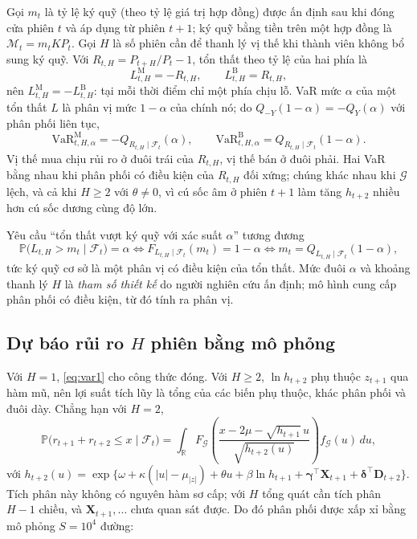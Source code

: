 \documentclass[12pt,a4paper]{article}
\theoremstyle{definition}
\theoremstyle{remark}
\newcommand{\Prob}{\mathbb{P}}
\newcommand{\VaR}{\mathrm{VaR}}
\newcommand{\Fcal}{\mathcal{F}}
\newcommand{\Gcal}{\mathcal{G}}
\newcommand{\bgamma}{\boldsymbol{\gamma}}
\newcommand{\bdelta}{\boldsymbol{\delta}}
\newcommand{\bX}{\mathbf{X}}
\newcommand{\bD}{\mathbf{D}}
\begin{document}
Gọi $m_t$ là tỷ lệ ký quỹ (theo tỷ lệ giá trị hợp đồng) được ấn định sau khi đóng cửa phiên $t$ và áp dụng từ phiên $t+1$; ký quỹ bằng tiền trên một hợp đồng là $\mathcal M_t=m_tKP_t$. Gọi $H$ là số phiên cần để thanh lý vị thế khi thành viên không bổ sung ký quỹ. Với $R_{t,H}=P_{t+H}/P_t-1$, tổn thất theo tỷ lệ của hai phía là
\begin{equation}
L^{\mathrm M}_{t,H}=-R_{t,H},\qquad L^{\mathrm B}_{t,H}=R_{t,H},
\end{equation}
nên $L^{\mathrm M}_{t,H}=-L^{\mathrm B}_{t,H}$: tại mỗi thời điểm chỉ một phía chịu lỗ. VaR mức $\alpha$ của một tổn thất $L$ là phân vị mức $1-\alpha$ của chính nó; do $Q_{-Y}(1-\alpha)=-Q_Y(\alpha)$ với phân phối liên tục,
\begin{equation}
\VaR^{\mathrm M}_{t,H,\alpha}=-Q_{R_{t,H}\mid\Fcal_t}(\alpha),\qquad
\VaR^{\mathrm B}_{t,H,\alpha}=Q_{R_{t,H}\mid\Fcal_t}(1-\alpha).
\end{equation}
Vị thế mua chịu rủi ro ở đuôi trái của $R_{t,H}$, vị thế bán ở đuôi phải. Hai VaR bằng nhau khi phân phối có điều kiện của $R_{t,H}$ đối xứng; chúng khác nhau khi $\Gcal$ lệch, và cả khi $H\ge2$ với $\theta\neq0$, vì cú sốc âm ở phiên $t+1$ làm tăng $h_{t+2}$ nhiều hơn cú sốc dương cùng độ lớn.

Yêu cầu ``tổn thất vượt ký quỹ với xác suất $\alpha$'' tương đương
\begin{equation}
\Prob\big(L_{t,H}>m_t\mid\Fcal_t\big)=\alpha\iff F_{L_{t,H}\mid\Fcal_t}(m_t)=1-\alpha\iff m_t=Q_{L_{t,H}\mid\Fcal_t}(1-\alpha),
\end{equation}
tức ký quỹ cơ sở là một phân vị có điều kiện của tổn thất. Mức đuôi $\alpha$ và khoảng thanh lý $H$ là \emph{tham số thiết kế} do người nghiên cứu ấn định; mô hình cung cấp phân phối có điều kiện, từ đó tính ra phân vị.

\subsection{Dự báo rủi ro $H$ phiên bằng mô phỏng}\label{sec:mophong}

Với $H=1$, \eqref{eq:var1} cho công thức đóng. Với $H\ge2$, $\ln h_{t+2}$ phụ thuộc $z_{t+1}$ qua hàm mũ, nên lợi suất tích lũy là tổng của các biến phụ thuộc, khác phân phối và đuôi dày. Chẳng hạn với $H=2$,
\begin{equation}
\Prob\big(r_{t+1}+r_{t+2}\le x\mid\Fcal_t\big)=\int_{\mathbb R}F_{\Gcal}\!\left(\frac{x-2\mu-\sqrt{h_{t+1}}\,u}{\sqrt{h_{t+2}(u)}}\right)f_{\Gcal}(u)\,du,
\end{equation}
với $h_{t+2}(u)=\exp\{\omega+\kappa(|u|-\mu_{|z|})+\theta u+\beta\ln h_{t+1}+\bgamma^\top\bX_{t+1}+\bdelta^\top\bD_{t+2}\}$. Tích phân này không có nguyên hàm sơ cấp; với $H$ tổng quát cần tích phân $H-1$ chiều, và $\bX_{t+1},\dots$ chưa quan sát được. Do đó phân phối được xấp xỉ bằng mô phỏng $S=10^4$ đường:
\end{document}
